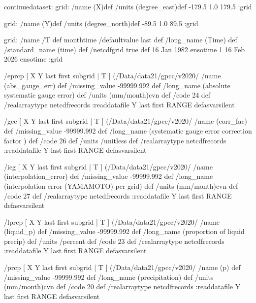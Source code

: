 \begin{ingrid}
continuedataset:
   grid:
   /name (X)def
   /units (degree_east)def
   -179.5 1.0 179.5
   :grid

   grid:
   /name (Y)def
   /units (degree_north)def
   -89.5 1.0 89.5
   :grid


   grid:
   /name /T def
   monthtime
   /defaultvalue {last} def
   /long_name (Time) def
   /standard_name (time) def
   /netcdfgrid true def
   16 Jan 1982 ensotime
   1
   16 Feb 2026 ensotime
   :grid

   /eprcp{
      [ X Y last first subgrid | T ] (/Data/data21/gpcc/v2020/%
      /name (abs_gauge_err) def
      /missing_value -99999.992 def
      /long_name (absolute systematic gauge error) def
      /units (mm/month)cvn def
      /code 24 def
      /realarraytype netcdfrecords :readdatafile
      Y last first RANGE
   }defasvarsilent

   /gec{
      [ X Y last first subgrid | T ] (/Data/data21/gpcc/v2020/%
      /name (corr_fac) def
       /missing_value -99999.992 def
       /long_name (systematic gauge error correction factor	) def
       /code 26 def
       /units /unitless def
       /realarraytype netcdfrecords :readdatafile
       Y last first RANGE
   }defasvarsilent

   /ieg{
      [ X Y last first subgrid | T ] (/Data/data21/gpcc/v2020/%
      /name (interpolation_error) def
       /missing_value -99999.992 def
       /long_name (interpolation error (YAMAMOTO) per grid) def
       /units (mm/month)cvn def
       /code 27 def
       /realarraytype netcdfrecords :readdatafile
       Y last first RANGE
   }defasvarsilent

   /lprcp{
      [ X Y last first subgrid | T ] (/Data/data21/gpcc/v2020/%
      /name (liquid_p) def
       /missing_value -99999.992 def
       /long_name (proportion of liquid precip) def
       /units /percent def
       /code 23 def
       /realarraytype netcdfrecords :readdatafile
       Y last first RANGE
   }defasvarsilent

   /prcp{
      [ X Y last first subgrid | T ] (/Data/data21/gpcc/v2020/%
      /name (p) def
       /missing_value -99999.992 def
       /long_name (precipitation) def
       /units (mm/month)cvn def
       /code 20 def
       /realarraytype netcdfrecords :readdatafile
       Y last first RANGE
   }defasvarsilent


\end{ingrid}

